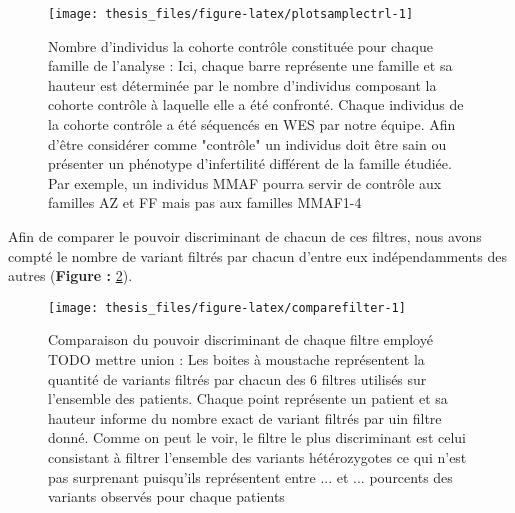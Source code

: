 \documentclass[12pt,twoside]{reedthesis}
\theoremstyle{definition}
\theoremstyle{definition}
\theoremstyle{remark}
\begin{document}
  \begin{figure}
  
  {\centering \texttt{[image: thesis\_files/figure-latex/plotsamplectrl-1]} 
  
  }
  
  \caption[Nombre d'individus la cohorte contrôle constituée pour chaque famille de l'analyse]{Nombre d'individus la cohorte contrôle constituée pour chaque famille de l'analyse : Ici, chaque barre représente une famille et sa hauteur est déterminée par le nombre d'individus composant la cohorte contrôle à laquelle elle a été confronté. Chaque individus de la cohorte contrôle a été séquencés en WES par notre équipe. Afin d'être considérer comme "contrôle" un individus doit être sain ou présenter un phénotype d'infertilité différent de la famille étudiée. Par exemple, un individus MMAF pourra servir de contrôle aux familles AZ et FF mais pas aux familles MMAF1-4}\label{fig:plotsamplectrl}
  \end{figure}
  
  Afin de comparer le pouvoir discriminant de chacun de ces filtres, nous
  avons compté le nombre de variant filtrés par chacun d'entre eux
  indépendamments des autres (\textbf{Figure : }\ref{fig:comparefilter}).
  
  \begin{figure}
  
  {\centering \texttt{[image: thesis\_files/figure-latex/comparefilter-1]} 
  
  }
  
  \caption[Comparaison du pouvoir discriminant de chaque filtre employé TODO mettre union]{Comparaison du pouvoir discriminant de chaque filtre employé TODO mettre union : Les boites à moustache représentent la quantité de variants filtrés par chacun des 6 filtres utilisés sur l'ensemble des patients. Chaque point représente un patient et sa hauteur informe du nombre exact de variant filtrés par uin filtre donné. Comme on peut le voir, le filtre le plus discriminant est celui consistant à filtrer l'ensemble des variants hétérozygotes ce qui n'est pas surprenant puisqu'ils représentent entre ... et ... pourcents des variants observés pour chaque patients}\label{fig:comparefilter}
  \end{figure}
  
\end{document}
